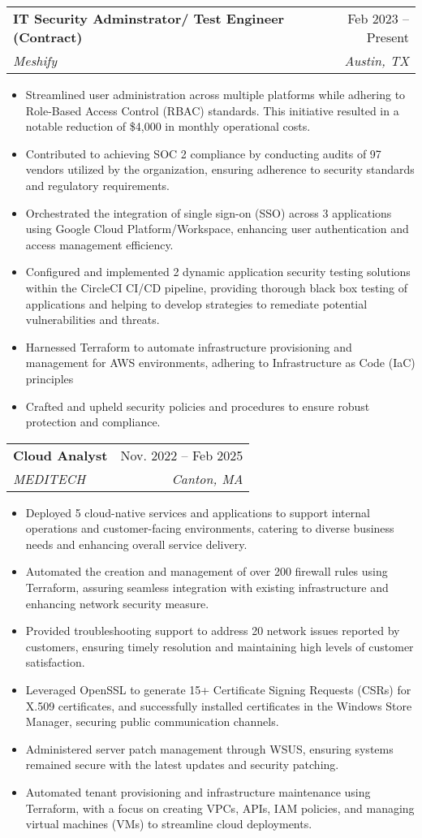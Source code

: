 \documentclass[letterpaper,10pt]{article}
\makeatletter
\newcommand{\resumeItem}[1]{
  \item\small{
    {#1 \vspace{-2pt}}
  }
}
\newcommand{\resumeSubheading}[4]{
  \vspace{-2pt}\item
    \begin{tabular*}{0.97\textwidth}[t]{l@{\extracolsep{\fill}}r}
      \textbf{#1} & #2 \\
      \textit{\small#3} & \textit{\small #4} \\
    \end{tabular*}\vspace{-7pt}
}
\newcommand{\resumeItemListStart}{\begin{itemize}}
\newcommand{\resumeItemListEnd}{\end{itemize}\vspace{-5pt}}
\makeatother
\begin{document}
  \resumeSubheading
      {IT Security Adminstrator/ Test Engineer (Contract)}{Feb 2023 -- Present}
      {Meshify}{Austin, TX}
      \resumeItemListStart
        \resumeItem{Streamlined user administration across multiple platforms while adhering to Role-Based Access Control (RBAC) standards. This initiative resulted in a notable reduction of \$4,000 in monthly operational costs.}
        \resumeItem{Contributed to achieving SOC 2 compliance by conducting audits of 97 vendors utilized by the organization,  ensuring adherence to security standards and regulatory requirements.}
        \resumeItem{Orchestrated the integration of single sign-on (SSO) across 3 applications using Google Cloud Platform/Workspace, enhancing user authentication and access management efficiency.}
        \resumeItem{Configured and implemented 2 dynamic application security testing solutions within the CircleCI CI/CD pipeline, providing thorough black box testing of applications and helping to develop strategies to remediate potential vulnerabilities and threats.}
        \resumeItem{Harnessed Terraform to automate infrastructure provisioning and management for AWS environments, adhering to Infrastructure as Code (IaC) principles}
        \resumeItem{Crafted and upheld security policies and procedures to ensure robust protection and compliance.}
      \resumeItemListEnd
      


    \resumeSubheading
      {Cloud Analyst}{Nov. 2022 -- Feb 2025}
      {MEDITECH}{Canton, MA}
      \resumeItemListStart
        \resumeItem{Deployed 5 cloud-native services and applications to support internal operations and customer-facing environments, catering to diverse business needs and enhancing overall service delivery.}
        \resumeItem{Automated the creation and management of over 200 firewall rules using Terraform, assuring seamless integration with existing infrastructure and enhancing network security measure.}
        \resumeItem{Provided troubleshooting support to address 20 network issues reported by customers, ensuring timely resolution and maintaining high levels of customer satisfaction.}
        \resumeItem{Leveraged OpenSSL to generate 15+ Certificate Signing Requests (CSRs) for X.509 certificates, and successfully installed certificates in the Windows Store Manager, securing public communication channels.}
        \resumeItem{Administered server patch management through WSUS, ensuring systems remained secure with the latest updates and security patching.}
        \resumeItem{Automated tenant provisioning and infrastructure maintenance using Terraform, with a focus on creating VPCs, APIs, IAM policies, and managing virtual machines (VMs) to streamline cloud deployments.}
    \resumeItemListEnd
\end{document}
